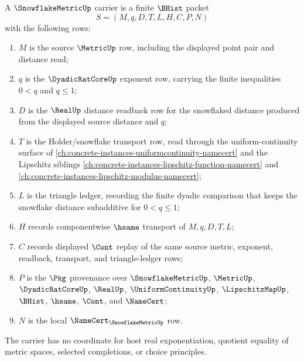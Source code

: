\begin{definition}
\label{def:snowflake-metric-carrier}
A $\SnowflakeMetricUp$ carrier is a finite $\BHist$ packet
$$
S=(M,q,D,T,L,H,C,P,N)
$$
with the following rows:
\begin{enumerate}
\item $M$ is the source $\MetricUp$ row, including the displayed point pair and distance read;
\item $q$ is the $\DyadicRatCoreUp$ exponent row, carrying the finite inequalities $0<q$ and $q\leq 1$;
\item $D$ is the $\RealUp$ distance readback row for the snowflaked distance produced from the displayed source distance and $q$;
\item $T$ is the Holder/snowflake transport row, read through the uniform-continuity surface of \autoref{ch:concrete-instances-uniformcontinuity-namecert} and the Lipschitz siblings \autoref{ch:concrete-instances-lipschitz-function-namecert} and \autoref{ch:concrete-instances-lipschitz-modulus-namecert};
\item $L$ is the triangle ledger, recording the finite dyadic comparison that keeps the snowflake distance subadditive for $0<q\leq 1$;
\item $H$ records componentwise $\hsame$ transport of $M,q,D,T,L$;
\item $C$ records displayed $\Cont$ replay of the same source metric, exponent, readback, transport, and triangle-ledger rows;
\item $P$ is the $\Pkg$ provenance over $\SnowflakeMetricUp$, $\MetricUp$, $\DyadicRatCoreUp$, $\RealUp$, $\UniformContinuityUp$, $\LipschitzMapUp$, $\BHist$, $\hsame$, $\Cont$, and $\NameCert$;
\item $N$ is the local $\NameCert_{\SnowflakeMetricUp}$ row.
\end{enumerate}
The carrier has no coordinate for host real exponentiation, quotient equality of metric spaces, selected completions, or choice principles.
\end{definition}


